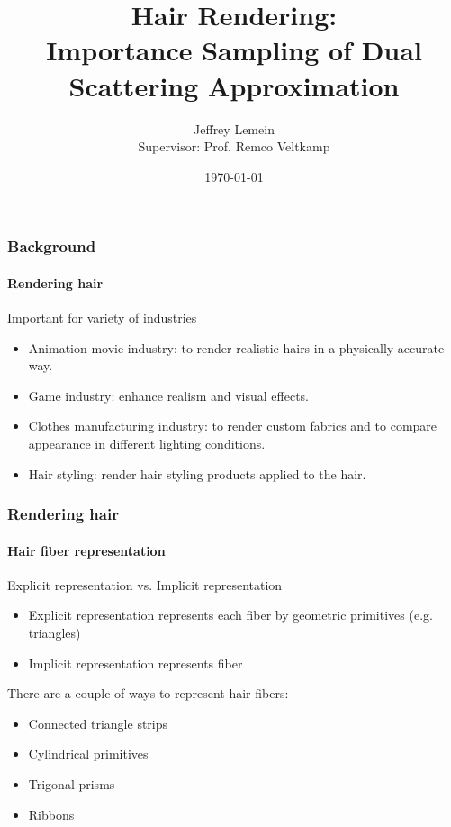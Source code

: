 \documentclass{beamer}
\begin{document}
\title[Short Title]{Hair Rendering:\\ Importance
Sampling of Dual Scattering
Approximation}
\author[Lastname]{Jeffrey Lemein\\\small Supervisor: Prof. Remco Veltkamp \\ \hspace{18mm}}
\date{\today}

\begin{frame}
\titlepage
\end{frame}

  \begin{frame}
    \frametitle{Background}
	\framesubtitle{Rendering hair}
	
	Important for variety of industries
	\begin{itemize}
	\item Animation movie industry: to render realistic hairs in a physically accurate way.
	\item Game industry: enhance realism and visual effects.
	\item Clothes manufacturing industry: to render custom fabrics and to compare appearance in different lighting conditions.
	\item Hair styling: render hair styling products applied to the hair.
	\end{itemize}
  \end{frame}
  
  \begin{frame}
    \frametitle{Rendering hair}
	\framesubtitle{Hair fiber representation}
	Explicit representation vs. Implicit representation
	
	\begin{itemize}
	\item Explicit representation represents each fiber by geometric primitives (e.g. triangles)
	\item Implicit representation represents fiber
	\end{itemize}
	
	There are a couple of ways to represent hair fibers:
	\begin{itemize}
	\item Connected triangle strips
	\item Cylindrical primitives
	\item Trigonal prisms
	\item Ribbons
	\end{itemize}
	

  \end{frame}
  
\end{document}
